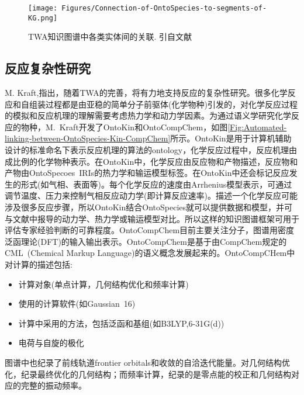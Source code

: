 \begin{figure}[h!]
\centering
\texttt{[image: Figures/Connection-of-OntoSpecies-to-segments-of-KG.png]}
\caption{\small\textrm{TWA知识图谱中各类实体间的关联. 引自文献~\cite{ACR56-128_2023}}}%
\label{Fig:OntoSpecies-to-segments-TWA}
\end{figure}

\subsection{反应复杂性研究}
\textrm{M. Kraft,}指出，随着\textrm{TWA}的完善，将有力地支持反应的复杂性研究。很多化学反应和自组装过程都是由亚稳的简单分子前驱体(化学物种)引发的，对化学反应过程的模拟和反应机理的理解需要考虑热力学和动力学因素。为通过语义学研究化学反应的物种，\textrm{M.~Kraft}开发了\textrm{OntoKin}和\textrm{OntoCompChem}，如图\ref{Fig:Automated-linking-between-OntoSpecies-Kin-CompChem}所示。\textrm{OntoKin}是用于计算机辅助设计的标准命名下表示反应机理的算法的\textrm{ontology}，化学反应过程中，反应机理由成比例的化学物种表示。在\textrm{OntoKin}中，化学反应由反应物和产物描述，反应物和产物由\textrm{OntoSpecoes~IRIs}的热力学和输运模型标签。在\textrm{OntoKin}中还会标记反应发生的形式(如气相、表面等)。每个化学反应的速度由\textrm{Arrhenius}模型表示，可通过调节温度、压力来控制气相反应动力学(即计算反应速率)。描述一个化学反应可能涉及很多反应步骤，所以\textrm{OntoKin}结合\textrm{OntoSpecies}就可以提供数据和模型，并可与文献中报导的动力学、热力学或输运模型对比。所以这样的知识图谱框架可用于评估专家经验判断的可靠程度。\textrm{OntoCompChem}目前主要关注分子，图谱用密度泛函理论\textrm{(DFT)}的输入输出表示。\textrm{OntoCompChem}是基于由\textrm{CompChem}规定的\textrm{CML~(Chemical Markup Language)}的语义概念发展起来的。\textrm{OntoCompCHem}中对计算的描述包括:
\begin{itemize}
	\item 计算对象(单点计算，几何结构优化和频率计算)
	\item 使用的计算软件(如\textrm{Gaussian~16})
	\item 计算中采用的方法，包括泛函和基组(如\textrm{B3LYP,6-31G(d)})
	\item 电荷与自旋的极化
\end{itemize}
图谱中也纪录了前线轨道\textrm{frontier orbitals}和收敛的自洽迭代能量。对几何结构优化，纪录最终优化的几何结构；而频率计算，纪录的是零点能的校正和几何结构对应的完整的振动频率。

